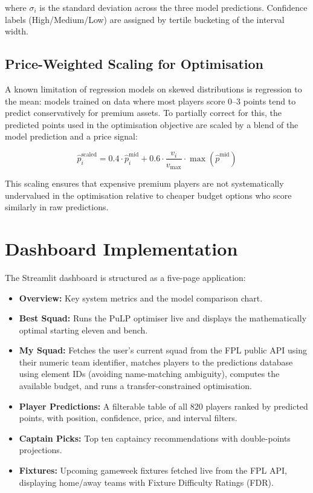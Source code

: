 \documentclass[11pt,english,listoffigures,listoftables]{tfgetsinf}
\begin{document}
where $\sigma_i$ is the standard deviation across the three model predictions. Confidence labels (High/Medium/Low) are assigned by tertile bucketing of the interval width.

\subsection{Price-Weighted Scaling for Optimisation}

A known limitation of regression models on skewed distributions is regression to the mean: models trained on data where most players score 0--3 points tend to predict conservatively for premium assets. To partially correct for this, the predicted points used in the optimisation objective are scaled by a blend of the model prediction and a price signal:

\begin{equation}
\hat{p}_i^{\text{scaled}} = 0.4 \cdot \hat{p}_i^{\text{mid}} + 0.6 \cdot \frac{v_i}{v_{\max}} \cdot \max(\hat{p}^{\text{mid}})
\end{equation}

This scaling ensures that expensive premium players are not systematically undervalued in the optimisation relative to cheaper budget options who score similarly in raw predictions.

\section{Dashboard Implementation}

The Streamlit dashboard is structured as a five-page application:

\begin{itemize}
    \item \textbf{Overview:} Key system metrics and the model comparison chart.
    \item \textbf{Best Squad:} Runs the PuLP optimiser live and displays the mathematically optimal starting eleven and bench.
    \item \textbf{My Squad:} Fetches the user's current squad from the FPL public API using their numeric team identifier, matches players to the predictions database using element IDs (avoiding name-matching ambiguity), computes the available budget, and runs a transfer-constrained optimisation.
    \item \textbf{Player Predictions:} A filterable table of all 820 players ranked by predicted points, with position, confidence, price, and interval filters.
    \item \textbf{Captain Picks:} Top ten captaincy recommendations with double-points projections.
    \item \textbf{Fixtures:} Upcoming gameweek fixtures fetched live from the FPL API, displaying home/away teams with Fixture Difficulty Ratings (FDR).
\end{itemize}
\end{document}
